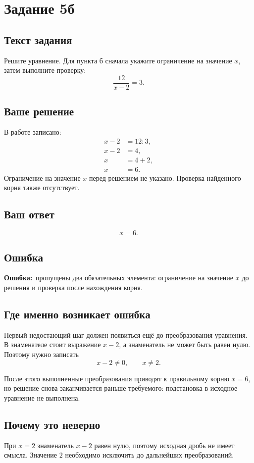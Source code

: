\documentclass[a4paper,12pt]{article}
\newcommand{\ErrorLabel}{\textcolor{red!75!black}{\textbf{Ошибка:}}}
\begin{document}
\newpage
{}\label{task:5b}
\section*{Задание 5б}

\subsection*{Текст задания}
Решите уравнение. Для пункта б сначала укажите ограничение на значение $x$, затем выполните проверку:
\[
\frac{12}{x-2}=3.
\]

\subsection*{Ваше решение}
В работе записано:
\[
\begin{aligned}
x-2&=12:3,\\
x-2&=4,\\
x&=4+2,\\
x&=6.
\end{aligned}
\]
Ограничение на значение $x$ перед решением не указано. Проверка найденного корня также отсутствует.

\subsection*{Ваш ответ}
\[
x=6.
\]

\subsection*{Ошибка}
\ErrorLabel\ пропущены два обязательных элемента: ограничение на значение $x$ до решения и проверка после нахождения корня.

\subsection*{Где именно возникает ошибка}
Первый недостающий шаг должен появиться ещё до преобразования уравнения. В знаменателе стоит выражение $x-2$, а знаменатель не может быть равен нулю. Поэтому нужно записать
\[
x-2\ne0,
\qquad
x\ne2.
\]

После этого выполненные преобразования приводят к правильному корню $x=6$, но решение снова заканчивается раньше требуемого: подстановка в исходное уравнение не выполнена.

\subsection*{Почему это неверно}
При $x=2$ знаменатель $x-2$ равен нулю, поэтому исходная дробь не имеет смысла. Значение $2$ необходимо исключить до дальнейших преобразований.
\end{document}
